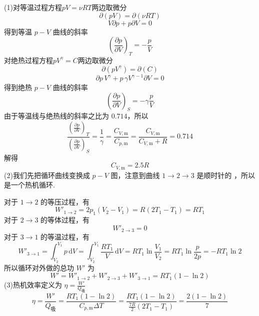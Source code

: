 \begin{solution}
    (1)对等温过程方程$pV = \nu RT$两边取微分
    $$
        \partial{(pV)} = \partial{(\nu RT)}
    $$
    $$
        V \partial{p} + p \partial{V} = 0
    $$
    得到等温 $p-V$ 曲线的斜率
    $$
        \left( \frac{\partial p}{\partial V} \right)_T = -\frac{p}{V}
    $$
    对绝热过程方程$pV^{\gamma} = C$两边取微分
    $$
        \partial \left(pV^{\gamma}\right) = \partial(C)
    $$
    $$
        \partial{p} \, V^\gamma + p \, \gamma V^{\gamma - 1} \partial{V} = 0
    $$
    得到绝热 $p-V$ 曲线的斜率
    $$
        \left( \frac{\partial p}{\partial V} \right)_S = -\gamma \frac{p}{V}
    $$
    由于等温线与绝热线的斜率之比为 $0.714$，所以
    $$
        \frac{
            \left(\frac{\partial p}{\partial V}\right)_T
        }{
            \left(\frac{\partial p}{\partial V}\right)_S
        }
        =\frac{1}{\gamma}
        = \frac{C_{V,\mathrm{m}}}{C_{p,\mathrm{m}}}
        = \frac{C_{V,\mathrm{m}}}{C_{V,\mathrm{m}} + R}
        = 0.714
    $$
    解得
    $$
        C_{V,\mathrm{m}} = 2.5R
    $$
    (2)我们先把循环曲线变换成 $p-V$ 图，注意到曲线 $1 \to 2 \to 3$ 是顺时针的 ，所以是一个热机循环.
    \begin{center}
    \end{center}
    对于 $1 \to 2$ 的等压过程，有
    $$
        W'_{1 \to 2} = 2p_1(V_2 - V_1) = R(2T_1 - T_1) = RT_1
    $$
    对于 $2 \to 3$ 的等体过程，有
    $$
        W'_{2 \to 3} = 0
    $$
    对于 $3 \to 1$ 的等温过程，有
    $$
        W'_{3 \to 1}
        = \int_{V_2}^{V_1} p \,\mathrm{d}V
        = \int_{V_2}^{V_1} \frac{RT_1}{V} \,\mathrm{d}V
        = RT_1\ln\frac{V_1}{V_2}
        = RT_1\ln\frac{p}{2p}
        = - RT_1\ln2
    $$
    所以循环对外做的总功 $W'$ 为
    $$
        W' = W'_{1 \to 2} + W'_{2 \to 3} + W'_{3 \to 1} = RT_1 (1-\ln2)
    $$
    (3)热机效率定义为 $\eta = \frac{W'}{Q_\text{吸}}$
    $$
        \eta = \frac{W'}{Q_\text{吸}} = \frac{RT_1 (1-\ln2)}{C_{p,\mathrm{m}}\Delta T}
        = \frac{ RT_1 (1-\ln2) }{ \frac{7R}{2}(2T_1 - T_1) }
        = \frac{2(1-\ln2)}{7}
    $$
\end{solution}

